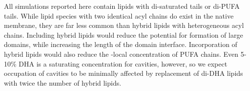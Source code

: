 
%


All simulations reported here contain lipids with di-saturated tails or di-PUFA tails. While lipid species with two identical acyl chains do exist in the native membrane, they are far less common than hybrid lipids with heterogeneous acyl chains.  Including hybrid lipids would reduce the potential for formation of large domains, while increasing the length of the domain interface. 
Incorporation of hybrid lipids would also reduce the \nachr-local concentration of PUFA chains.  Even 5-10\% DHA is a saturating concentration for \nachr cavities, however, so we expect occupation of cavities to be minimally affected by replacement of di-DHA lipids with twice the number of hybrid lipids. 

